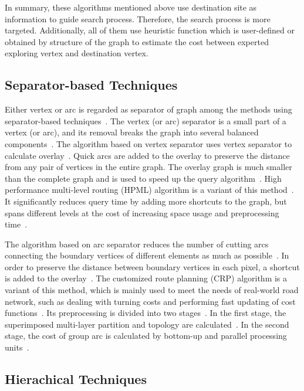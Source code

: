 \documentclass[conference]{IEEEtran}
\begin{document}
In summary, these algorithms mentioned above use destination site as information to guide search process. Therefore, the search process is more targeted. Additionally, all of them use heuristic function which is user-defined or obtained by structure of the graph to estimate the cost between experted exploring vertex and destination vertex.

\subsection{Separator-based Techniques}

Either vertex or arc is regarded as separator of graph among the methods using separator-based techniques~\cite{self_driving}. The vertex (or arc) separator is a small part of a vertex (or arc), and its removal breaks the graph into several balanced components~\cite{bast2016route}. The algorithm based on vertex separator uses vertex separator to calculate overlay~\cite{bast2016route}. Quick arcs are added to the overlay to preserve the distance from any pair of vertices in the entire graph. The overlay graph is much smaller than the complete graph and is used to speed up the query algorithm~\cite{bast2016route}. High performance multi-level routing (HPML) algorithm is a variant of this method~\cite{delling2009high}. It significantly reduces query time by adding more shortcuts to the graph, but spans different levels at the cost of increasing space usage and preprocessing time~\cite{delling2009high}.

The algorithm based on arc separator reduces the number of cutting arcs connecting the boundary vertices of different elements as much as possible~\cite{bast2016route}. In order to preserve the distance between boundary vertices in each pixel, a shortcut is added to the overlay~\cite{bast2016route}. The customized route planning (CRP) algorithm is a variant of this method, which is mainly used to meet the needs of real-world road network, such as dealing with turning costs and performing fast updating of cost functions~\cite{delling2017customizable}. Its preprocessing is divided into two stages~\cite{delling2017customizable}. In the first stage, the superimposed multi-layer partition and topology are calculated~\cite{delling2017customizable}. In the second stage, the cost of group arc is calculated by bottom-up and parallel processing units~\cite{delling2017customizable}.

\subsection{Hierachical Techniques}
\end{document}
